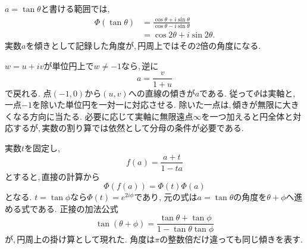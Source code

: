 $a=\tan\theta$と書ける範囲では,
\[
 \begin{aligned}
 \Phi(\tan\theta)
 &=\frac{\cos\theta+i\sin\theta}{\cos\theta-i\sin\theta}\\
 &=\cos2\theta+i\sin2\theta.
 \end{aligned}
\]
実数$a$を傾きとして記録した角度が,\,円周上ではその2倍の角度になる.
\NewFigCayley

$w=u+iv$が単位円上で$w\ne-1$なら,\,逆に
\[
 a=\frac{v}{1+u}
\]
で戻れる.
点$(-1,0)$から$(u,v)$への直線の傾きが$a$である.
従って$\Phi$は実軸と,\,一点$-1$を除いた単位円を一対一に対応させる.
除いた一点は,\,傾きが無限に大きくなる方向に当たる.
必要に応じて実軸に無限遠点$\infty$を一つ加えると円全体と対応するが,\,実数の割り算では依然として分母の条件が必要である.

実数$t$を固定し,
\[
 f(a)=\frac{a+t}{1-ta}
\]
とすると,\,直接の計算から
\[
 \Phi(f(a))=\Phi(t)\Phi(a)
\]
となる. $t=\tan\phi$なら$\Phi(t)=e^{2i\phi}$であり,
元の式は$a=\tan\theta$の角度を$\theta+\phi$へ進める式である.
正接の加法公式
\[
 \tan(\theta+\phi)
 =\frac{\tan\theta+\tan\phi}{1-\tan\theta\tan\phi}
\]
が,\,円周上の掛け算として現れた.
角度は$\pi$の整数倍だけ違っても同じ傾きを表す.
